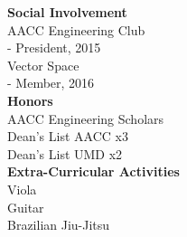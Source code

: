 \documentclass[10pt]{article}
\begin{document}
\begin{textblock}{0.3}
    \textbf{Social Involvement} \\
    AACC Engineering Club \\
    - President, 2015 \\
    Vector Space \\
    - Member, 2016 \\

    \textbf{Honors} \\
    AACC Engineering Scholars \\
    Dean's List AACC x3 \\
    Dean's List UMD x2 \\

    \textbf{Extra-Curricular Activities} \\
    Viola \\
    Guitar \\
    Brazilian Jiu-Jitsu
  \end{textblock}
\end{document}
